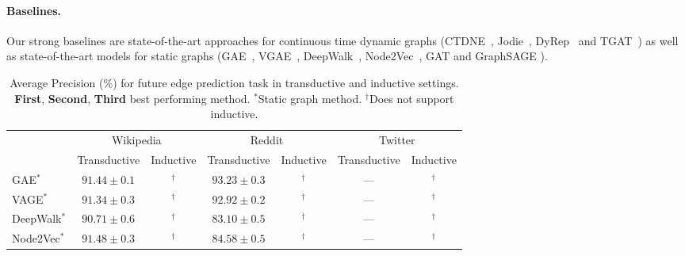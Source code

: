 \documentclass{article}
\begin{document}
\paragraph{Baselines.} Our strong baselines are state-of-the-art approaches for continuous time dynamic graphs (CTDNE~\citep{10.1145/3184558.3191526}, Jodie~\citep{10.1145/3292500.3330895}, DyRep~\citep{trivedi2018dyrep} and TGAT~\citep{Xu2020Inductive}) as well as state-of-the-art models for static graphs (GAE~\citep{kipf2016variational}, VGAE~\citep{kipf2016variational}, DeepWalk~\citep{10.1145/2623330.2623732},  Node2Vec~\citep{10.1145/2939672.2939754}, GAT \citep{DBLP:conf/iclr/VelickovicCCRLB18} and GraphSAGE \citep{hamilton2017representation}). 


\begin{table}
  \caption{Average Precision (\%) for future edge prediction task in transductive and inductive settings. {\bf \bf \color{red} First}, {\bf \bf \color{violet} Second}, {\bf Third} best performing method. $^*$Static graph method.  $^\dagger$Does not support inductive.}
  \label{tab:edge-prediction}
  \centering
  \hspace*{-0.82cm}
  \begin{tabular}{lcccccc}
    \toprule
                     & \multicolumn{2}{c}{Wikipedia}                    & \multicolumn{2}{c}{Reddit}                        & \multicolumn{2}{c}{Twitter}                       \\
    \cmidrule(r){2-7} 
                     & Transductive            & Inductive              & Transductive            & Inductive               & Transductive            & Inductive               \\
    \midrule
    GAE$^*$          & $91.44\pm0.1$           & $^\dagger$             & $93.23\pm0.3$           & $^\dagger$              & ---                     & $^\dagger$              \\
    VAGE$^*$         & $91.34\pm0.3$           & $^\dagger$             & $92.92\pm0.2$           & $^\dagger$              & ---                     & $^\dagger$              \\
    DeepWalk$^*$     & $90.71\pm0.6$           & $^\dagger$             & $83.10\pm0.5$           & $^\dagger$              & ---                     & $^\dagger$              \\
    Node2Vec$^*$     & $91.48\pm0.3$           & $^\dagger$             & $84.58\pm0.5$           & $^\dagger$              & ---                     & $^\dagger$              \\

\end{tabular}
\end{table}
\end{document}
